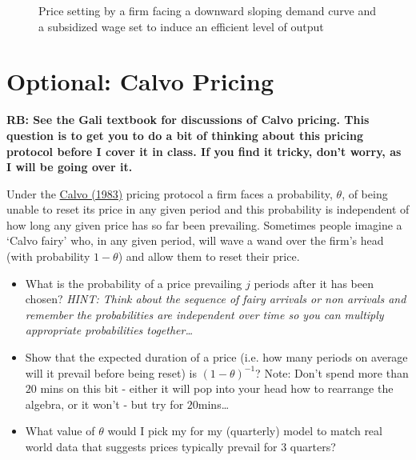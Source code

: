 \documentclass[authoryear,11pt]{elsarticle}
\begin{document}
\begin{figure}[!htb]
\caption{\label{fig:monop_comp_subsidy} Price setting by a firm facing a downward sloping demand curve and a subsidized wage set to induce an efficient level of output}
\end{figure}

\section{Optional: Calvo Pricing}
\textbf{RB: See the Gali textbook for discussions of Calvo pricing. This question is to get you to do a bit of thinking about this pricing protocol before I cover it in class. If you find it tricky, don't worry, as I will be going over it.}

Under the \href{https://www.sciencedirect.com/science/article/pii/0304393283900600}{Calvo (1983)} pricing protocol a firm faces a probability, $\theta$, of being unable to reset its price in any given period and this probability is independent of how long any given price has so far been prevailing. Sometimes people imagine a `Calvo fairy' who, in any given period, will wave a wand over the firm's head (with probability $1-\theta$) and allow them to reset their price.
\begin{itemize}
\item	What is the probability of a price prevailing $j$ periods after it has been chosen? \textit{HINT: Think about the sequence of fairy arrivals or non arrivals and remember the probabilities are independent over time so you can multiply appropriate probabilities together\ldots}
\item	Show that the expected duration of a price (i.e. how many periods on average will it prevail before being reset) is $(1-\theta)^{-1}$? Note: Don't spend more than $20$ mins on this bit - either it will pop into your head how to rearrange the algebra, or it won't - but try for $20$mins\ldots
\item	What value of $\theta$ would I pick my for my (quarterly) model to match real world data that suggests prices typically prevail for $3$ quarters?
\end{itemize}
\end{document}
